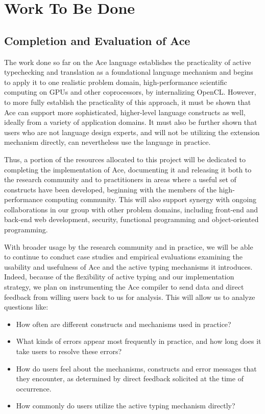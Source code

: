 \section{Work To Be Done}
\subsection{Completion and Evaluation of Ace}
The work done so far on the Ace language establishes the practicality of active typechecking and translation as a foundational language mechanism and begins to apply it to one realistic problem domain, high-performance scientific computing on GPUs and other coprocessors, by internalizing OpenCL. However, to more fully establish the practicality of this approach, it must be shown that Ace can support more sophisticated, higher-level language constructs as well, ideally from a variety of application domains. It must also be further shown that users who are not language design experts, and will not be utilizing the extension mechanism directly, can nevertheless use the language in practice. 

Thus, a portion of the resources allocated to this project will be dedicated to completing the implementation of Ace, documenting it and releasing it both to the research community and to practitioners in areas where a useful set of constructs have been developed, beginning with the members of the high-performance computing community. This will also support synergy with ongoing collaborations in our group with other problem domains, including front-end and back-end web development, security, functional programming and object-oriented programming.

With broader usage by the research community and in practice, we will be able to continue to conduct case studies and empirical evaluations examining the usability and usefulness of Ace and the active typing mechanisms it introduces. Indeed, because of the flexibility of active typing and our implementation strategy, we plan on instrumenting the Ace compiler to send data and direct feedback from willing users back to us for analysis. This will allow us to analyze questions like:
\begin{itemize}
\item How often are different constructs and mechanisms used in practice?
\item What kinds of errors appear most frequently in practice, and how long does it take users to resolve these errors?
\item How do users feel about the mechanisms, constructs and error messages that they encounter, as determined by direct feedback solicited at the time of occurrence.
\item How commonly do users utilize the active typing mechanism directly?
\end{itemize}

